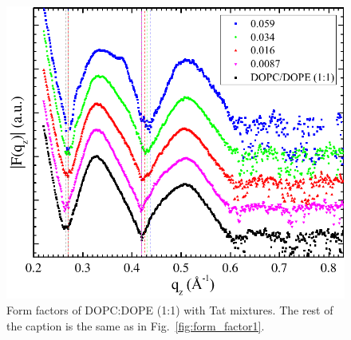 \begin{figure}[htbp]
  \centering
  \includegraphics[width=\textwidth]{figures/Tat/NFIT_results/DOPCDOPE1to1_form_factors}
  \caption[Form factors of DOPC:DOPE (1:1) with Tat mixtures]
  {Form factors of DOPC:DOPE (1:1) with Tat mixtures.
  The rest of the caption is the same as in Fig.~\ref{fig:form_factor1}.}
  \label{fig:form_factor3}
\end{figure}

